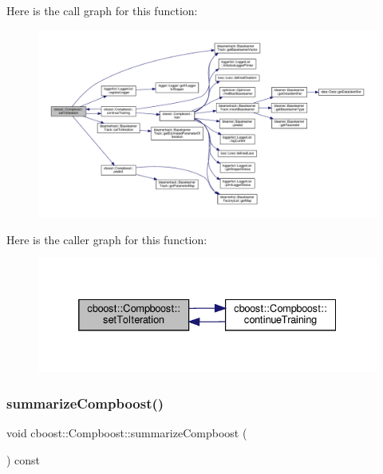 Here is the call graph for this function\+:\nopagebreak
\begin{figure}[H]
\begin{center}
\leavevmode
\includegraphics[width=350pt]{classcboost_1_1_compboost_ad1ee3b88f585f38255d827dceb4b7659_cgraph}
\end{center}
\end{figure}
Here is the caller graph for this function\+:\nopagebreak
\begin{figure}[H]
\begin{center}
\leavevmode
\includegraphics[width=332pt]{classcboost_1_1_compboost_ad1ee3b88f585f38255d827dceb4b7659_icgraph}
\end{center}
\end{figure}
\mbox{\label{classcboost_1_1_compboost_a7be8cb767054ece895d535c1f468233e}} 
\subsubsection{\texorpdfstring{summarize\+Compboost()}{summarizeCompboost()}}
{\footnotesize\ttfamily void cboost\+::\+Compboost\+::summarize\+Compboost (\begin{DoxyParamCaption}{ }\end{DoxyParamCaption}) const}


